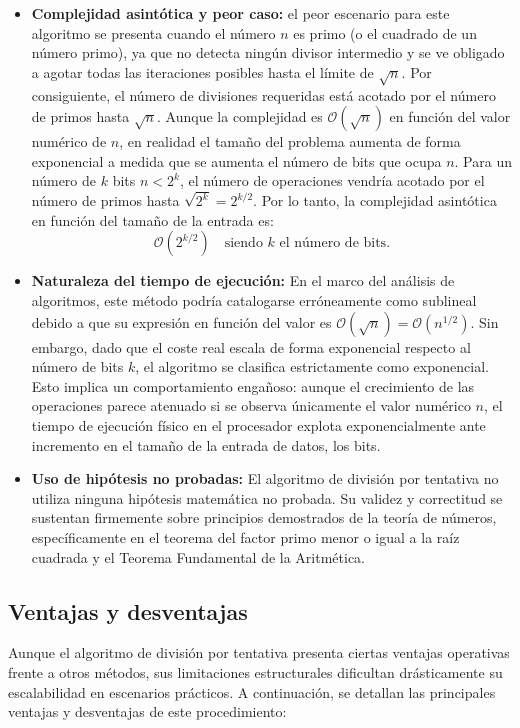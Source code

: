 \documentclass[11pt,a4paper,spanish]{book}
\begin{document}
\begin{itemize}
    \item \textbf{Complejidad asintótica y peor caso:} el peor escenario para este algoritmo se presenta cuando el número $n$ es primo (o el cuadrado de un número primo), ya que no detecta ningún divisor intermedio y se ve obligado a agotar todas las iteraciones posibles hasta el límite de $\sqrt{n}$. Por consiguiente, el número de divisiones requeridas está acotado por el número de primos hasta $\sqrt{n}$. Aunque la complejidad es $\mathcal{O} (\sqrt{n})$ en función del valor numérico de $n$, en realidad el tamaño del problema aumenta de forma exponencial a medida que se aumenta el número de bits que ocupa $n$. Para un número de $k$ bits $n<2^k$, el número de operaciones vendría acotado por el número de primos hasta $\sqrt{2^k} = 2^{k/2}$. Por lo tanto, la complejidad asintótica en función del tamaño de la entrada es:
        $$\mathcal{O} (2^{k/2}) \quad \text{siendo } k \text{ el número de bits}.$$

    \item \textbf{Naturaleza del tiempo de ejecución:} En el marco del análisis de algoritmos, este método podría catalogarse erróneamente como sublineal debido a que su expresión en función del valor es $\mathcal{O}(\sqrt{n}) = \mathcal{O}(n^{1/2})$. Sin embargo, dado que el coste real escala de forma exponencial respecto al número de bits $k$, el algoritmo se clasifica estrictamente como exponencial. Esto implica un comportamiento engañoso: aunque el crecimiento de las operaciones parece atenuado si se observa únicamente el valor numérico $n$, el tiempo de ejecución físico en el procesador explota exponencialmente ante incremento en el tamaño de la entrada de datos, los bits.

    \item \textbf{Uso de hipótesis no probadas:} El algoritmo de división por tentativa no utiliza ninguna hipótesis matemática no probada. Su validez y correctitud se sustentan firmemente sobre principios demostrados de la teoría de números, específicamente en el teorema del factor primo menor o igual a la raíz cuadrada y el Teorema Fundamental de la Aritmética.
\end{itemize}

\subsection{Ventajas y desventajas}

Aunque el algoritmo de división por tentativa presenta ciertas ventajas operativas frente a otros métodos, sus limitaciones estructurales dificultan drásticamente su escalabilidad en escenarios prácticos. A continuación, se detallan las principales ventajas y desventajas de este procedimiento:
\end{document}
